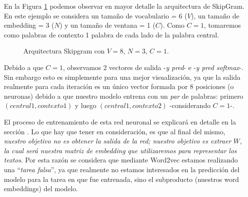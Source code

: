 \documentclass[12pt,a4paper]{article}
\begin{document}
\begin{sloppypar}
En la Figura \ref{fig:Imagen_NLP_23} podemos observar en mayor detalle la arquitectura de SkipGram. En este ejemplo se considera un tamaño de vocabulario = 6 ($V$), un tamaño de embedding = 3 ($N$) y un tamaño de ventana = 1 ($C$). Como $C=1$, tomaremos como palabras de contexto 1 palabra de cada lado de la palabra central.

\begin{figure}[H]  
\centering
\noindent{}
\caption{Arquitectura Skipgram con $V=8$, $N=3$, $C=1$.}
\label{fig:Imagen_NLP_23}
\end{figure}

Debido a que $C=1$, observamos 2 vectores de salida -\textit{y pred}- e -\textit{y pred softmax}-. Sin embargo esto es simplemente para una mejor visualización, ya que la salida realmente para cada iteración es un único vector formada por 8 posiciones (o neuronas) debido a que nuestro modelo entrena con un \textit{par} de palabras: primero $(central1, contexto1)$ y luego $(central1, contexto2)$ -considerando $C=1$-. 

El proceso de entrenamiento de esta red neuronal se explicará en detalle en la sección \textit{}. Lo que hay que tener en consideración, es que al final del mismo, \textit{nuestro objetivo no es obtener la salida de la red; nuestro objetivo es extraer $W$, la cual será nuestra matriz de embedding que utilizaremos para representar los textos}. Por esta razón se considera que mediante Word2vec estamos realizando una “\textit{tarea falsa}”, ya que realmente no estamos interesados en la predicción del modelo para la tarea en que fue entrenada, sino el subproducto (nuestros word embeddings) del modelo.


\end{sloppypar}
\end{document}
